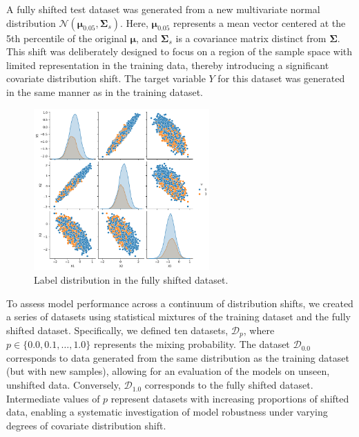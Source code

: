 A fully shifted test dataset was generated from a new multivariate normal distribution $\mathcal{N}(\boldsymbol{\mu}_{0.05}, \boldsymbol{\Sigma}_s)$. Here, $\boldsymbol{\mu}_{0.05}$ represents a mean vector centered at the 5th percentile of the original $\boldsymbol{\mu}$, and $\boldsymbol{\Sigma}_s$ is a covariance matrix distinct from $\boldsymbol{\Sigma}$. This shift was deliberately designed to focus on a region of the sample space with limited representation in the training data, thereby introducing a significant covariate distribution shift. The target variable $Y$ for this dataset was generated in the same manner as in the training dataset.

\begin{figure}
    \centering
    \includegraphics[width=0.6\textwidth]{assets/label_dist_fullyshift.png}
    \caption{Label distribution in the fully shifted dataset.}
    \label{fig:label_dist_fullyshift}
\end{figure}

To assess model performance across a continuum of distribution shifts, we created a series of datasets using statistical mixtures of the training dataset and the fully shifted dataset. Specifically, we defined ten datasets, $\mathcal{D}_p$, where $p \in \{0.0, 0.1, \ldots, 1.0\}$ represents the mixing probability. The dataset $\mathcal{D}_{0.0}$ corresponds to data generated from the same distribution as the training dataset (but with new samples), allowing for an evaluation of the models on unseen, unshifted data. Conversely, $\mathcal{D}_{1.0}$ corresponds to the fully shifted dataset. Intermediate values of $p$ represent datasets with increasing proportions of shifted data, enabling a systematic investigation of model robustness under varying degrees of covariate distribution shift.


